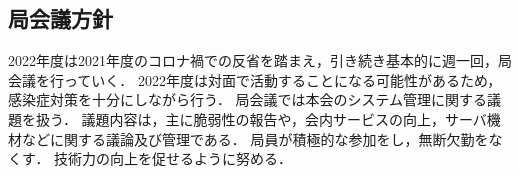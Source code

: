 \subsection*{局会議方針}

2022年度は2021年度のコロナ禍での反省を踏まえ，引き続き基本的に週一回，局会議を行っていく．
2022年度は対面で活動することになる可能性があるため， 感染症対策を十分にしながら行う．
局会議では本会のシステム管理に関する議題を扱う．
議題内容は，主に脆弱性の報告や，会内サービスの向上，サーバ機材などに関する議論及び管理である．
局員が積極的な参加をし，無断欠勤をなくす．
技術力の向上を促せるように努める．
